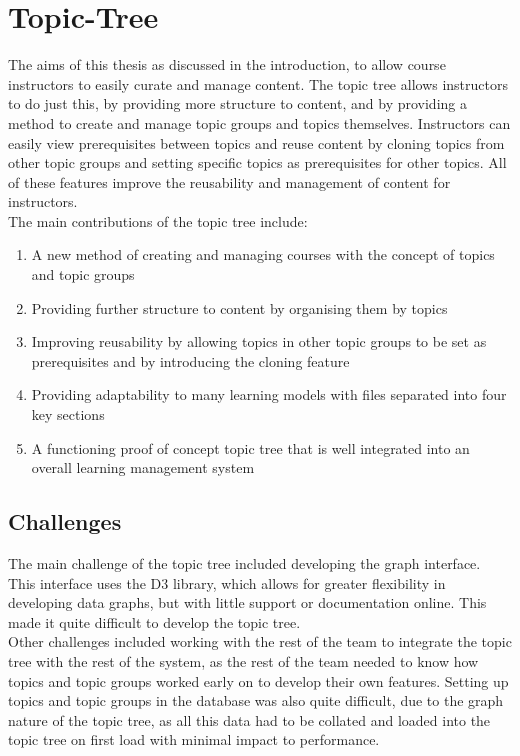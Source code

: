 \section{Topic-Tree}
The aims of this thesis as discussed in the introduction, to allow course instructors to easily curate and manage content. The topic tree allows instructors to do just this, by providing more structure to content, and by providing a method to create and manage topic groups and topics themselves. Instructors can easily view prerequisites between topics and reuse content by cloning topics from other topic groups and setting specific topics as prerequisites for other topics. All of these features improve the reusability and management of content for instructors.\\

The main contributions of the topic tree include:
\begin{enumerate}
    \item A new method of creating and managing courses with the concept of topics and topic groups
	\item Providing further structure to content by organising them by topics 
	\item Improving reusability by allowing topics in other topic groups to be set as prerequisites and by introducing the cloning feature
    \item Providing adaptability to many learning models with files separated into four key sections
    \item A functioning proof of concept topic tree that is well integrated into an overall learning management system
\end{enumerate}

\subsection{Challenges}
The main challenge of the topic tree included developing the graph interface. This interface uses the D3 library, which allows for greater flexibility in developing data graphs, but with little support or documentation online. This made it quite difficult to develop the topic tree.\\

Other challenges included working with the rest of the team to integrate the topic tree with the rest of the system, as the rest of the team needed to know how topics and topic groups worked early on to develop their own features. Setting up topics and topic groups in the database was also quite difficult, due to the graph nature of the topic tree, as all this data had to be collated and loaded into the topic tree on first load with minimal impact to performance. \\

